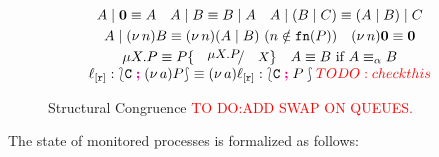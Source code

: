 \documentclass[runningheads]{llncs}
\newcommand{\todo}[1]{\textcolor{red}{TO DO:#1}}
\begin{document}
\begin{figure}[t!]
{%
\[
	\begin{array}{c}
		A \Par \inact \scong A
		\quad
		A \Par B \scong B \Par A
		\quad
		A \Par (B \Par C) \scong (A \Par B) \Par C
		\\[1mm]
		A \Par \news{n} B \scong \news{n}(A \Par B)
		\ (n \notin \fn{P})
				\quad
		\news{n} \inact \scong \inact
		\\[1mm]
		\recp{X}{P} \scong P\subst{\recp{X}{P}}{\rvar{X}}
		\quad
		A \scong B \textrm{ if } A \scong_\alpha B\\
		\modif{\np{\key{\loc}{\er}}{\conf{\stack{C}}{\news{a}P}} \scong \news{a}\np{\key{\loc}{\er}}{\conf{\stack{C}}{P}} }\todo{check this}
	\end{array}
\]
}
\vspace{-4mm}
\caption{Structural Congruence \todo{ADD SWAP ON QUEUES.}}
\label{fig:str}
\end{figure}
%

The state of monitored processes is formalized as follows:
\end{document}
